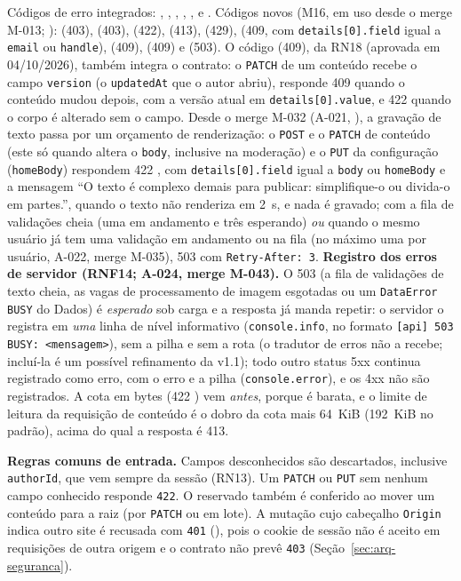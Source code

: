 Códigos de erro integrados: , , , , ,  e . Códigos novos (M16, em uso desde o merge M-013; ):  (403),  (403),  (422),  (413),  (429),  (409, com \texttt{details[0].field} igual a \texttt{email} ou \texttt{handle}),  (409),  (409) e  (503). O código  (409), da RN18 (aprovada em 04/10/2026), também integra o contrato: o \texttt{PATCH} de um conteúdo recebe o campo \texttt{version} (o \texttt{updatedAt} que o autor abriu), responde 409 quando o conteúdo mudou depois, com a versão atual em \texttt{details[0].value}, e 422 quando o corpo é alterado sem o campo. Desde o merge M-032 (A-021, ), a gravação de texto passa por um orçamento de renderização: o \texttt{POST} e o \texttt{PATCH} de conteúdo (este só quando altera o \texttt{body}, inclusive na moderação) e o \texttt{PUT} da configuração (\texttt{homeBody}) respondem 422 , com \texttt{details[0].field} igual a \texttt{body} ou \texttt{homeBody} e a mensagem ``O texto é complexo demais para publicar: simplifique-o ou divida-o em partes.'', quando o texto não renderiza em 2~s, e nada é gravado; com a fila de validações cheia (uma em andamento e três esperando) \emph{ou} quando o mesmo usuário já tem uma validação em andamento ou na fila (no máximo uma por usuário, A-022, merge M-035), 503  com \texttt{Retry-After: 3}. \textbf{Registro dos erros de servidor (RNF14; A-024, merge M-043).} O 503  (a fila de validações de texto cheia, as vagas de processamento de imagem esgotadas ou um \texttt{DataError} \texttt{BUSY} do Dados) é \emph{esperado} sob carga e a resposta já manda repetir: o servidor o registra em \emph{uma} linha de nível informativo (\texttt{console.info}, no formato \texttt{[api] 503 BUSY: <mensagem>}), sem a pilha e sem a rota (o tradutor de erros não a recebe; incluí-la é um possível refinamento da v1.1); todo outro status 5xx continua registrado como erro, com o erro e a pilha (\texttt{console.error}), e os 4xx não são registrados. A cota em bytes (422 ) vem \emph{antes}, porque é barata, e o limite de leitura da requisição de conteúdo é o dobro da cota mais 64~KiB (192~KiB no padrão), acima do qual a resposta é 413.

\textbf{Regras comuns de entrada.} Campos desconhecidos são descartados, inclusive \texttt{authorId}, que vem sempre da sessão (RN13). Um \texttt{PATCH} ou \texttt{PUT} sem nenhum campo conhecido responde \texttt{422}. O  reservado também é conferido ao mover um conteúdo para a raiz (por \texttt{PATCH} ou em lote). A mutação cujo cabeçalho \texttt{Origin} indica outro site é recusada com \texttt{401} (), pois o cookie de sessão não é aceito em requisições de outra origem e o contrato não prevê \texttt{403} (Seção~\ref{sec:arq-seguranca}).

